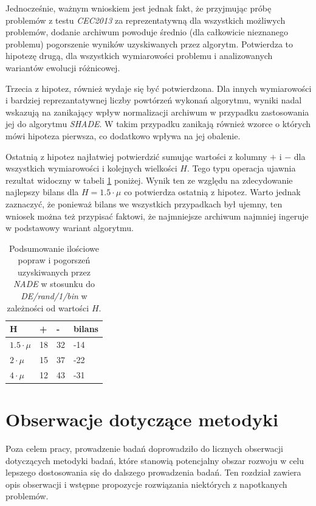 \documentclass[12pt,a4paper]{report}
\begin{document}
{{{{{{{\par{
Jednocześnie, ważnym wnioskiem jest jednak fakt, że przyjmując próbę problemów z testu \emph{CEC2013} za reprezentatywną dla wszystkich możliwych problemów, dodanie archiwum powoduje średnio (dla całkowicie nieznanego problemu) pogorszenie wyników uzyskiwanych przez algorytm. Potwierdza to hipotezę drugą, dla wszystkich wymiarowości problemu i analizowanych wariantów ewolucji różnicowej.
}
\par{
Trzecia z hipotez, również wydaje się być potwierdzona. Dla innych wymiarowości i bardziej reprezantatywnej liczby powtórzeń wykonań algorytmu, wyniki nadal wskazują na zanikający wpływ normalizacji archiwum w przypadku zastosowania jej do algorytmu \emph{SHADE}. W takim przypadku zanikają również wzorce o których mówi hipoteza pierwsza, co dodatkowo wpływa na jej obalenie.
}
\par{
Ostatnią z hipotez najłatwiej potwierdzić sumując wartości z kolumny $+$ i $-$ dla wszystkich wymiarowości i kolejnych wielkości $H$. Tego typu operacja ujawnia rezultat widoczny w tabeli \ref{FULLSUMSUM} poniżej. Wynik ten ze względu na zdecydowanie najlepszy bilans dla $H = 1.5 \cdot \mu$ co potwierdza ostatnią z hipotez. Warto jednak zaznaczyć, że ponieważ bilans we wszystkich przypadkach był ujemny, ten wniosek można też przypisać faktowi, że najmniejsze archiwum najmniej ingeruje w podstawowy wariant algorytmu.
}

\begin{table}[h]
\centering
\caption{Podsumowanie ilościowe popraw i pogorszeń uzyskiwanych przez \emph{NADE} w stosunku do \emph{DE/rand/1/bin} w zależności od wartości $H$.}
\label{FULLSUMSUM}
\begin{tabular}{|l|l|l|l|}
\hline
{\bf H}               & {\bf +} & {\bf -} & {\bf bilans} \\ \hline
{\bf $1.5 \cdot \mu$} & 18       & 32       & -14            \\ \hline
{\bf $2 \cdot \mu$}   & 15       & 37       & -22            \\ \hline
{\bf $4 \cdot \mu$}   & 12       & 43       & -31            \\ \hline
\end{tabular}
\end{table}

\chapter{Obserwacje dotyczące metodyki}
\label{metodyka}
\par{
Poza celem pracy, prowadzenie badań doprowadziło do licznych obserwacji dotyczących metodyki badań, które stanowią potencjalny obszar rozwoju w celu lepszego dostosowania się do dalszego prowadzenia badań. Ten rozdział zawiera opis obserwacji i wstępne propozycje rozwiązania niektórych z napotkanych problemów.
}
}}}}}}}
\end{document}
